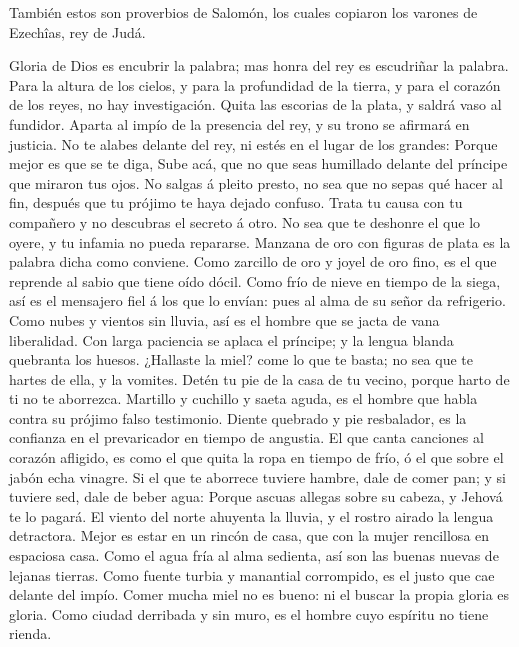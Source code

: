  También estos son proverbios de Salomón, los cuales
copiaron los varones de Ezechîas, rey de Judá.

 Gloria de Dios es encubrir la palabra; mas honra del rey
es escudriñar la palabra.  Para la altura de los cielos, y
para la profundidad de la tierra, y para el corazón de los reyes, no hay
investigación.  Quita las escorias de la plata, y saldrá
vaso al fundidor.  Aparta al impío de la presencia del
rey, y su trono se afirmará en justicia.  No te alabes
delante del rey, ni estés en el lugar de los grandes: 
Porque mejor es que se te diga, Sube acá, que no que seas humillado
delante del príncipe que miraron tus ojos.  No salgas á
pleito presto, no sea que no sepas qué hacer al fin, después que tu
prójimo te haya dejado confuso.  Trata tu causa con tu
compañero y no descubras el secreto á otro.  No sea que
te deshonre el que lo oyere, y tu infamia no pueda repararse.
 Manzana de oro con figuras de plata es la palabra dicha
como conviene.  Como zarcillo de oro y joyel de oro fino,
es el que reprende al sabio que tiene oído dócil.  Como
frío de nieve en tiempo de la siega, así es el mensajero fiel á los que
lo envían: pues al alma de su señor da refrigerio.  Como
nubes y vientos sin lluvia, así es el hombre que se jacta de vana
liberalidad.  Con larga paciencia se aplaca el príncipe;
y la lengua blanda quebranta los huesos.  ¿Hallaste la
miel? come lo que te basta; no sea que te hartes de ella, y la vomites.
 Detén tu pie de la casa de tu vecino, porque harto de ti
no te aborrezca.  Martillo y cuchillo y saeta aguda, es
el hombre que habla contra su prójimo falso testimonio. 
Diente quebrado y pie resbalador, es la confianza en el prevaricador en
tiempo de angustia.  El que canta canciones al corazón
afligido, es como el que quita la ropa en tiempo de frío, ó el que sobre
el jabón echa vinagre.  Si el que te aborrece tuviere
hambre, dale de comer pan; y si tuviere sed, dale de beber agua:
 Porque ascuas allegas sobre su cabeza, y Jehová te lo
pagará.  El viento del norte ahuyenta la lluvia, y el
rostro airado la lengua detractora.  Mejor es estar en un
rincón de casa, que con la mujer rencillosa en espaciosa casa.
 Como el agua fría al alma sedienta, así son las buenas
nuevas de lejanas tierras.  Como fuente turbia y
manantial corrompido, es el justo que cae delante del impío.
 Comer mucha miel no es bueno: ni el buscar la propia
gloria es gloria.  Como ciudad derribada y sin muro, es
el hombre cuyo espíritu no tiene rienda.

